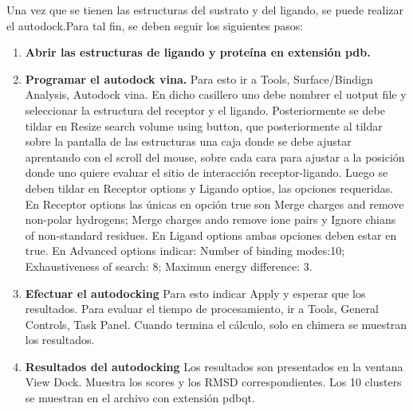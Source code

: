 Una vez que se tienen las estructuras del sustrato y del ligando, se puede realizar el autodock.Para tal fin, se deben seguir los siguientes pasos:
    \begin{enumerate}
        \item \textbf{Abrir las estructuras de ligando y proteína en extensión pdb.} \
         \item \textbf{Programar el autodock vina.} Para esto ir a Tools, Surface/Bindign Analysis, Autodock vina. En dicho casillero uno debe nombrer el uotput file y seleccionar la estructura del receptor y el ligando. Posteriormente se debe tildar en Resize search volume using button, que posteriormente al tildar sobre la pantalla de las estructuras una caja donde se debe ajustar  aprentando con el scroll del mouse, sobre cada cara para ajustar a la posición donde uno quiere evaluar el sitio de interacción receptor-ligando. Luego se deben tildar en Receptor options y Ligando optios, las opciones requeridas. En Receptor options las únicas en opción true son Merge charges and remove non-polar hydrogens; Merge charges ando remove ione pairs y Ignore chians of non-standard residues. En Ligand options ambas opciones deben estar en true. En Advanced options indicar: Number of binding modes:10; Exhaustiveness of search: 8; Maximun energy difference: 3.\
         \item\textbf{Efectuar el autodocking} Para esto indicar Apply y esperar que los resultados. Para evaluar el tiempo de procesamiento, ir a Tools, General Controls, Task Panel. Cuando termina el cálculo, solo en chimera se muestran los resultados.
         \item\textbf{Resultados del autodocking} Los resultados son presentados en la ventana View Dock. Muestra los scores y los RMSD correspondientes. Los 10 clusters se muestran en el archivo con extensión pdbqt.
    \end{enumerate}
    
		


\newpage